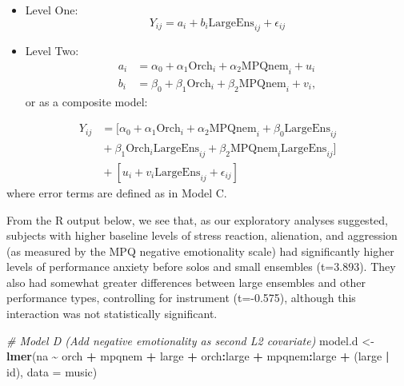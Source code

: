 \documentclass[
]{krantz}
\newenvironment{Shaded}{\begin{snugshade}}{\end{snugshade}}
\newcommand{\AttributeTok}[1]{\textcolor[rgb]{0.27,0.27,0.27}{#1}}
\newcommand{\CommentTok}[1]{\textcolor[rgb]{0.37,0.37,0.37}{\textit{#1}}}
\newcommand{\FunctionTok}[1]{\textcolor[rgb]{0.27,0.27,0.27}{\textbf{#1}}}
\newcommand{\NormalTok}[1]{#1}
\newcommand{\OtherTok}[1]{\textcolor[rgb]{0.37,0.37,0.37}{#1}}
\newcommand{\SpecialCharTok}[1]{\textcolor[rgb]{0.43,0.43,0.43}{\textbf{#1}}}
\begin{document}
\begin{itemize}
\item
  Level One:
  \begin{equation*}
  Y_{ij} = a_{i}+b_{i}\textrm{LargeEns}_{ij}+\epsilon_{ij}
  \end{equation*}
\item
  Level Two:
  \begin{align*}
  a_{i} & = \alpha_{0}+\alpha_{1}\textrm{Orch}_{i}+\alpha_{2}\textrm{MPQnem}_{i}+u_{i} \\
  b_{i} & = \beta_{0}+\beta_{1}\textrm{Orch}_{i}+\beta_{2}\textrm{MPQnem}_{i}+v_{i},
  \end{align*}
  or as a composite model:
\end{itemize}

\begin{align*}
Y_{ij} & = [\alpha_{0}+\alpha_{1}\textrm{Orch}_{i}+\alpha_{2}\textrm{MPQnem}_{i}+\beta_{0}\textrm{LargeEns}_{ij} \\
 & \textrm{} + \beta_{1}\textrm{Orch}_{i}\textrm{LargeEns}_{ij}+\beta_{2}\textrm{MPQnem}_{i}\textrm{LargeEns}_{ij}] \\
 & \textrm{} + [u_{i}+v_{i}\textrm{LargeEns}_{ij}+\epsilon_{ij}]
\end{align*}
where error terms are defined as in Model C.

From the R output below, we see that, as our exploratory analyses suggested, subjects with higher baseline levels of stress reaction, alienation, and aggression (as measured by the MPQ negative emotionality scale) had significantly higher levels of performance anxiety before solos and small ensembles (t=3.893). They also had somewhat greater differences between large ensembles and other performance types, controlling for instrument (t=-0.575), although this interaction was not statistically significant.

\begin{Shaded}
\begin{Highlighting}[]
\CommentTok{\# Model D (Add negative emotionality as second L2 covariate)}
\NormalTok{model.d }\OtherTok{\textless{}{-}} \FunctionTok{lmer}\NormalTok{(na }\SpecialCharTok{\textasciitilde{}}\NormalTok{ orch }\SpecialCharTok{+}\NormalTok{ mpqnem }\SpecialCharTok{+}\NormalTok{ large }\SpecialCharTok{+}\NormalTok{ orch}\SpecialCharTok{:}\NormalTok{large }\SpecialCharTok{+} 
\NormalTok{  mpqnem}\SpecialCharTok{:}\NormalTok{large }\SpecialCharTok{+}\NormalTok{ (large }\SpecialCharTok{|}\NormalTok{ id), }\AttributeTok{data =}\NormalTok{ music)}
\end{Highlighting}
\end{Shaded}
\end{document}
